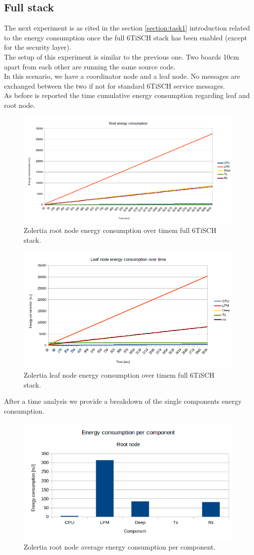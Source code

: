 \documentclass[conference]{IEEEtran}
\begin{document}
\subsection{Full stack}
The next experiment is as cited in the section \ref{section:task1} introduction related to the energy consumption once the full 6TiSCH stack has been enabled (except for the security layer).\\
The setup of this experiment is similar to the previous one.
Two boards 10cm apart from each other are running the same source code.\\
In this scenario, we have a coordinator node and a leaf node. No messages are exchanged between the two if not for standard 6TiSCH service messages.\\
As before is reported the time cumulative energy consumption regarding leaf and root node. 
\begin{figure}[H]
	\centering
	\includegraphics[width=.5\textwidth,keepaspectratio]{RootConsumptionTime.png}
	\caption{Zolertia root node energy consumption over timem full 6TiSCH stack.}
	\label{fig:RootConsumptionTime}
\end{figure}
\begin{figure}[H]
	\centering
	\includegraphics[width=.5\textwidth,keepaspectratio]{LeafConsumptionTime.png}
	\caption{Zolertia leaf node energy consumption over timem full 6TiSCH stack.}
	\label{fig:RootConsumptionTime}
\end{figure}
After a time analysis we provide a breakdown of the single components energy consumption.
\begin{figure}[htbp]
	\centering
	\includegraphics[width=.5\textwidth,keepaspectratio]{RootConsumptionComponent.png}
	\caption{Zolertia root node average energy consumption per component.}
	\label{fig:RootConsumptionComponent}
\end{figure}
\end{document}
